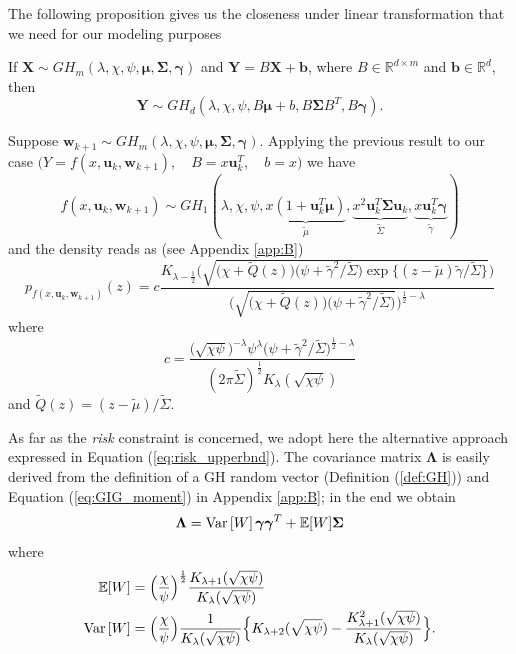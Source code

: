The following proposition gives us the closeness under linear transformation that we need for our modeling purposes
\begin{proposition}
	If $\bm{X} \sim GH_m(\lambda,\chi,\psi,\bm{\mu},\bm{\Sigma},\bm{\gamma})$ and $\bm{Y}=B\bm{X}+\bm{b}$, where $B \in \mathbb{R}^{d\times m}$ and $\bm{b} \in \mathbb{R}^d$, then
	\[ \bm{Y} \sim GH_d(\lambda,\chi,\psi,B\bm{\mu}+b,B\bm{\Sigma}B^T,B\bm{\gamma}). \]
\end{proposition}
Suppose $\bm{w}_{k+1} \sim GH_m(\lambda,\chi,\psi,\bm{\mu},\bm{\Sigma},\bm{\gamma})$. Applying the previous result to our case $\big(Y = f(x,\bm{u}_k, \bm{w}_{k+1}),\quad B=x\bm{u}_k^T,\quad b = x\big)$ we have \[ f(x,\bm{u}_k,\bm{w}_{k+1}) \sim GH_1(\lambda,\chi,\psi,\underbrace{x(1+\bm{u}_k^T\bm{\mu})}_{\widetilde{\mu}},\underbrace{x^2\bm{u}_k^T\bm{\Sigma}\bm{u}_k}_{\widetilde{\Sigma}},\underbrace{x\bm{u}_k^T\bm{\gamma}}_{\widetilde{\gamma}}) \] and the density reads as (see Appendix  \ref{app:B})
\begin{equation}\label{eq:GHdensity}
\boxed{p_{f(x,\bm{u}_k, \bm{w}_{k+1})}(z) = c \frac{K_{\lambda-\frac{1}{2}}\Big(\sqrt{\big(\chi+\widetilde{Q}(z) \big)\big(\psi+\widetilde{\gamma}^2/\widetilde{\Sigma} \big)\exp\big\{(z-\widetilde{\mu})\widetilde{\gamma}/\widetilde{\Sigma} \big\}}\Big)}{\Big(\sqrt{\big(\chi+\widetilde{Q}(z) \big)\big(\psi+\widetilde{\gamma}^2/\widetilde{\Sigma} \big)}\Big)^{\frac{1}{2}-\lambda}}}
\end{equation}
where \[ c = \frac{\big(\sqrt{\chi\psi}\big)^{-\lambda}\psi^{\lambda}\big(\psi+\widetilde{\gamma}^2/\widetilde{\Sigma}\big)^{\frac{1}{2}-\lambda}}{(2\pi\widetilde{\Sigma})^{\frac{1}{2}}K_{\lambda}(\sqrt{\chi\psi})} \]
and $\widetilde{Q}(z)= (z-\widetilde{\mu})/\widetilde{\Sigma}$.


As far as the \textit{risk} constraint is concerned, we adopt here the alternative approach expressed in Equation (\ref{eq:risk_upperbnd}). The covariance matrix $\bm{\Lambda}$ is easily derived from the definition of a GH random vector (Definition (\ref{def:GH})) and Equation (\ref{eq:GIG_moment}) in Appendix \ref{app:B}; in the end we obtain
\begin{equation}
\bm{\Lambda} = \operatorname{Var}\left[W\right]\bm{\gamma}\bm{\gamma}^T+\mathbb{E}[W]\bm{\Sigma}
\end{equation}
where
\begin{align*}
\mathbb{E}[W] & = \Big(\frac{\chi}{\psi}\Big)^{\frac{1}{2}}\frac{K_{\lambda+1}(\sqrt{\chi\psi})}{K_{\lambda}(\sqrt{\chi\psi})}\\
\operatorname{Var}\left[W\right] & = \Big(\frac{\chi}{\psi}\Big)\frac{1}{K_{\lambda}(\sqrt{\chi\psi})}\Big\{K_{\lambda+2}(\sqrt{\chi\psi})-\frac{K_{\lambda+1}^2(\sqrt{\chi\psi})}{K_{\lambda}(\sqrt{\chi\psi})} \Big\}.
\end{align*}



